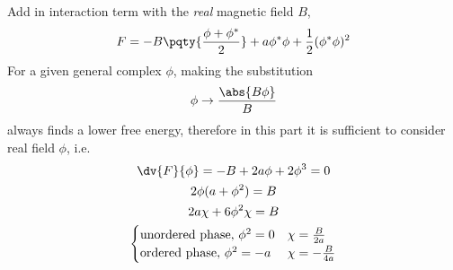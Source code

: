 \documentclass[12pt]{article}
\begin{document}
        \subsubsection{} Add in interaction term with the \emph{real} magnetic field \(B\), \[
            F = - B\pqty{\frac{\phi + \phi^*}{2}} + a\phi^*\phi + \frac{1}{2} (\phi^*\phi)^2
        \]
        For a given general complex \(\phi\), making the substitution \[
            \phi\to \frac{\abs{B\phi}}{B} 
        \]
        always finds a lower free energy, therefore in this part it is sufficient to consider real field \(\phi\), i.e. \begin{gather*}
            \dv{F}{\phi} = - B + 2a\phi + 2\phi^3 =  0\\
            2\phi(a + \phi^2) = B\\
            2a\chi + 6\phi^2 \chi = B\\
            \begin{cases}
                \text{unordered phase, } \phi^2 = 0&\chi = \frac{B}{2a}\\
                \text{ordered phase, }\phi^2 = - a&\chi = -\frac{B}{4a}\\
            \end{cases}
        \end{gather*}
\end{document}
